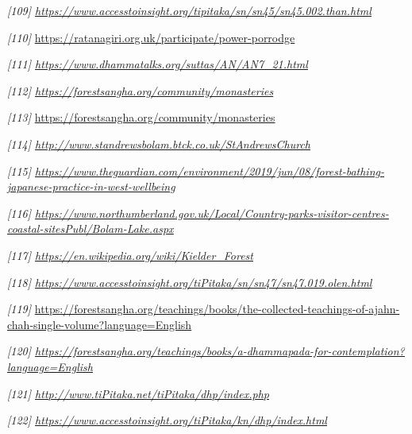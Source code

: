 \emph{{[}109{]}
\href{https://www.accesstoinsight.org/tipitaka/sn/sn45/sn45.002.than.html}{\underline{https://www.accesstoinsight.org/tipitaka/sn/sn45/sn45.002.than.html}}}

\emph{{[}110{]}}
\url{https://ratanagiri.org.uk/participate/power-porrodge}

\emph{{[}111{]}
\href{https://www.dhammatalks.org/suttas/AN/AN7_21.html}{\underline{https://www.dhammatalks.org/suttas/AN/AN7\_21.html}}}

\emph{{[}112{]}
\href{https://forestsangha.org/community/monasteries}{\underline{https://forestsangha.org/community/monasteries}}}

\emph{{[}113{]}} \url{https://forestsangha.org/community/monasteries}

\emph{{[}114{]}
\href{http://www.standrewsbolam.btck.co.uk/StAndrewsChurch}{\underline{http://www.standrewsbolam.btck.co.uk/StAndrewsChurch}}}

\emph{{[}115{]}
\href{https://www.theguardian.com/environment/2019/jun/08/forest-bathing-japanese-practice-in-west-wellbeing}{\underline{https://www.theguardian.com/environment/2019/jun/08/forest-bathing-japanese-practice-in-west-wellbeing}}}

\emph{{[}116{]}
\href{https://www.northumberland.gov.uk/Local/Country-parks-visitor-centres-coastal-sitesPubl/Bolam-Lake.aspx}{\underline{https://www.northumberland.gov.uk/Local/Country-parks-visitor-centres-coastal-sitesPubl/Bolam-Lake.aspx}}}

\emph{{[}117{]}
\href{https://en.wikipedia.org/wiki/Kielder_Forest}{\underline{https://en.wikipedia.org/wiki/Kielder\_Forest}}}

\emph{{[}118{]}
\href{https://www.accesstoinsight.org/tiPitaka/sn/sn47/sn47.019.olen.html}{\underline{https://www.accesstoinsight.org/tiPitaka/sn/sn47/sn47.019.olen.html}}}

\emph{{[}119{]}}
\url{https://forestsangha.org/teachings/books/the-collected-teachings-of-ajahn-chah-single-volume?language=English}

\emph{{[}120{]}
\href{https://forestsangha.org/teachings/books/a-dhammapada-for-contemplation?language=English}{\underline{https://forestsangha.org/teachings/books/a-dhammapada-for-contemplation?language=English}}}

\emph{{[}121{]}
\href{http://www.tiPitaka.net/tiPitaka/dhp/index.php}{\underline{http://www.tiPitaka.net/tiPitaka/dhp/index.php}}}

\emph{{[}122{]}
\href{https://www.accesstoinsight.org/tiPitaka/kn/dhp/index.html}{\underline{https://www.accesstoinsight.org/tiPitaka/kn/dhp/index.html}}}

